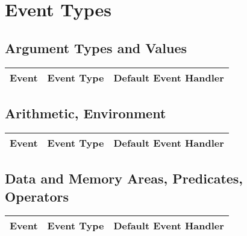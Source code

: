 \section{Event Types}

\subsection{Argument Types and Values}
\begin{tabular}{|p{1.2cm}p{8cm}p{5cm}|}
\hline
{\bf Event} & {\bf Event Type} & {\bf Default Event Handler}\\
\hline

\hline
\end{tabular}

\subsection{Arithmetic, Environment}
\begin{tabular}{|p{1.2cm}p{8cm}p{5cm}|}
\hline
{\bf Event} & {\bf Event Type} & {\bf Default Event Handler}\\
\hline

\hline
\end{tabular}

\vspace*{\fill}


\subsection{Data and Memory Areas, Predicates, Operators}
\begin{tabular}{|p{1.2cm}p{8cm}p{5cm}|}
\hline
{\bf Event} & {\bf Event Type} & {\bf Default Event Handler}\\
\hline

\hline
\end{tabular}

